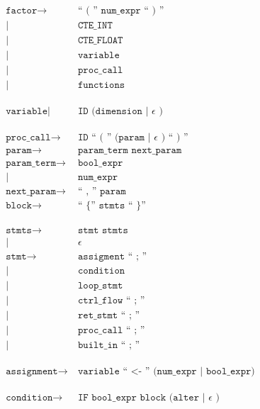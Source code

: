 \begin{align*}
	\texttt{factor}
	\rightarrow&\ \texttt{`` ( '' num\_expr `` ) ''}\\
            |&\ \texttt{CTE\_INT}\\
            |&\ \texttt{CTE\_FLOAT}\\
            |&\ \texttt{variable}\\
            |&\ \texttt{proc\_call}\\
            |&\ \texttt{functions}\\
	\phantom{0}\\
	\texttt{variable}
            |&\ \texttt{ID (dimension | } \epsilon \texttt{ )}\\
	\phantom{0}\\
	\texttt{proc\_call}
	\rightarrow&\ \texttt{ID `` ( '' (param | } \epsilon \texttt{ ) `` ) ''}\\
	\texttt{param}
	\rightarrow&\ \texttt{param\_term next\_param}\\
	\texttt{param\_term}
	\rightarrow&\ \texttt{bool\_expr}\\
            |&\ \texttt{num\_expr}\\
	\texttt{next\_param}
	\rightarrow&\ \texttt{`` , '' param}\\
	\texttt{block}
	\rightarrow&\ \texttt{`` \{ '' stmts `` \} ''}\\
	\phantom{0}\\
	\texttt{stmts}
	\rightarrow&\ \texttt{stmt stmts}\\
            |&\ \epsilon\\
	\texttt{stmt}
	\rightarrow&\ \texttt{assigment  `` ; ''}\\
            |&\ \texttt{condition}\\
            |&\ \texttt{loop\_stmt}\\
            |&\ \texttt{ctrl\_flow `` ; ''}\\
            |&\ \texttt{ret\_stmt `` ; ''}\\
            |&\ \texttt{proc\_call `` ; ''}\\
            |&\ \texttt{built\_in `` ; ''}\\
	\phantom{0}\\
	\texttt{assignment}
	\rightarrow&\ \texttt{variable `` <- '' (num\_expr | bool\_expr)}\\
	\phantom{0}\\
	\texttt{condition}
	\rightarrow&\ \texttt{IF bool\_expr block (alter | } \epsilon \texttt{ )}\\
	\phantom{0}\\

\end{align*}
